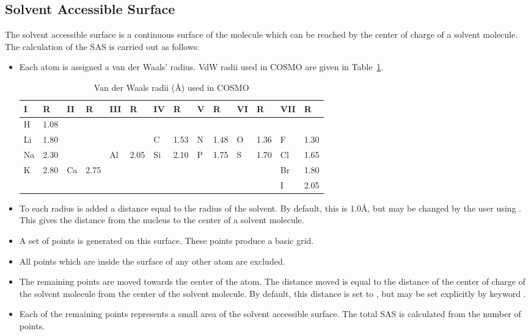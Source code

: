 \subsection{Solvent Accessible Surface}
The solvent accessible surface is a continuous surface of the molecule which
can be reached by the center of charge of a solvent molecule.  The calculation 
of the SAS is carried out as follows:

\begin{itemize} 
\item Each atom is assigned a van der Waals' radius.  VdW radii used in COSMO
are given in Table~\ref{vdw}.
\begin{table}
\caption{\label{vdw} Van der Waals radii (\AA ) used in COSMO}
\begin{center}
\begin{tabular}{llllllllllllll}
\hline
 I  & R    & II & R    &III& R    &IV & R    & V & R    &VI & R    &VII& R \\
\hline
 H  & 1.08 & \\
 Li & 1.80 &    &      &   &      & C & 1.53 & N & 1.48 & O & 1.36 & F & 1.30\\
 Na & 2.30 &    &      & Al& 2.05 & Si& 2.10 & P & 1.75 & S & 1.70 & Cl& 1.65\\
 K  & 2.80 & Ca & 2.75 &   &      &   &      &   &      &   &      &Br & 1.80\\
    &      &    &      &   &      &   &      &   &      &   &      &I  &  2.05\\
\hline
\end{tabular}
\end{center}
\end{table}

\item To each radius is added a distance equal to the radius of the solvent. By
default, this is 1.0\AA, but may be changed by the user using 
. This gives the distance from the nucleus to the center of
a solvent molecule.
\item A set of points is generated on this surface. These points produce a
basic grid.
\item All points which are inside the surface of any other atom are excluded.
\item The remaining points are moved towards the center of the atom.  The
distance moved is equal to the distance of the center of charge of the solvent
molecule from the center of the solvent molecule.  By default, this distance is
set to , but may be set explicitly by keyword .
\item Each of the remaining points represents a small area of the solvent
accessible surface.  The total SAS is calculated from the number of points.
\end{itemize}

